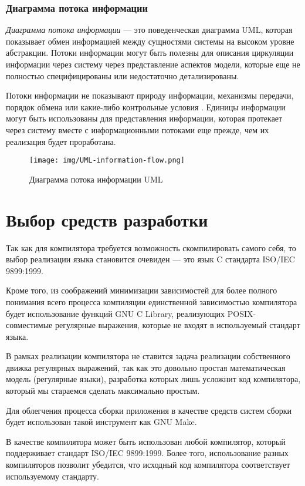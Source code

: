 \documentclass[14pt,russian]{extarticle}
\newcommand*\term[1]{\textit{#1}}
\begin{document}
\subsubsection{Диаграмма потока информации}

\term{Диаграмма потока информации} --- это поведенческая диаграмма UML, которая
показывает обмен информацией между сущностями системы на высоком уровне
абстракции. Потоки информации могут быть полезны для описания циркуляции
информации через систему через представление аспектов модели, которые еще не
полностью специфицированы или недостаточно детализированы.

Потоки информации не показывают природу информации, механизмы передачи, порядок
обмена или какие-либо контрольные условия \cite{penker}. Единицы информации могут быть
использованы для представления информации, которая протекает через систему
вместе с информационными потоками еще прежде, чем их реализация будет
проработана.

\begin{figure}[H]
	\centering
	\texttt{[image: img/UML-information-flow.png]}
	\caption{Диаграмма потока информации UML}
\end{figure}

\clearpage
\section{Выбор средств разработки}

Так как для компилятора требуется возможность скомпилировать самого себя, то
выбор реализации языка становится очевиден --- это язык C стандарта ISO/IEC
9899:1999.

Кроме того, из соображений минимизации зависимостей для более полного понимания
всего процесса компиляции единственной зависимостью компилятора будет
использование функций GNU C Library, реализующих POSIX-совместимые регулярные
выражения, которые не входят в используемый стандарт языка.

В рамках реализации компилятора не ставится задача реализации собственного
движка регулярных выражений, так как это довольно простая математическая модель
(регулярные языки), разработка которых лишь усложнит код компилятора, который мы
стараемся сделать максимально простым.

Для облегчения процесса сборки приложения в качестве средств систем сборки будет
использован такой инструмент как GNU Make.

В качестве компилятора может быть использован любой компилятор, который
поддерживает стандарт ISO/IEC 9899:1999. Более того, использование разных
компиляторов позволит убедится, что исходный код компилятора соответствует
используемому стандарту.
\end{document}
